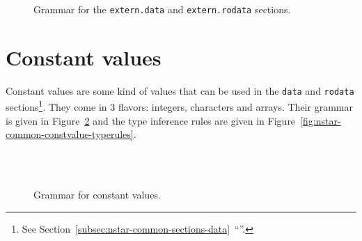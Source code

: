 \begin{figure}[htb]
  \centering

  \caption{Grammar for the \texttt{extern.data} and \texttt{extern.rodata} sections.}
  \label{fig:nstar-common-sections-extern-data-grammar}
\end{figure}

\section{Constant values}\label{sec:nstar-common-constvalue}

Constant values are some kind of values that can be used in the \texttt{data} and \texttt{rodata} sections\footnote{See Section~\ref{subsec:nstar-common-sections-data}~``''.}.
They come in 3 flavors: integers, characters and arrays.
Their grammar is given in Figure~\ref{fig:nstar-common-constvalue-grammar} and the type inference rules are given in Figure~\ref{fig:nstar-common-constvalue-typerules}.

\begin{figure}[htb]
  \centering
  \\
  \\

  \caption{Grammar for constant values.}
  \label{fig:nstar-common-constvalue-grammar}
\end{figure}

